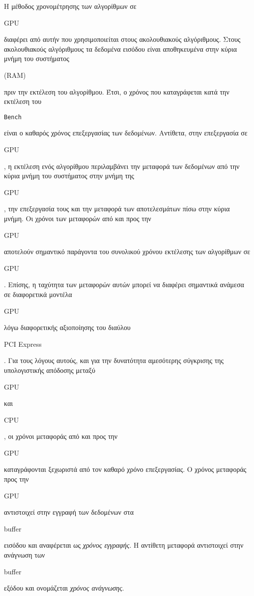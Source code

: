 Η μέθοδος χρονομέτρησης των αλγορίθμων σε \begin{english}GPU\end{english} διαφέρει από αυτήν που χρησιμοποιείται στους ακολουθιακούς αλγόριθμους. Στους ακολουθιακούς αλγόριθμους τα δεδομένα εισόδου είναι αποθηκευμένα στην κύρια μνήμη του συστήματος \begin{english}(RAM)\end{english} πριν την εκτέλεση του αλγορίθμου. Έτσι, ο χρόνος που καταγράφεται κατά την εκτέλεση του \begin{english}\verb!Bench!\end{english} είναι ο καθαρός χρόνος επεξεργασίας των δεδομένων. Αντίθετα, στην επεξεργασία σε \begin{english}GPU\end{english}, η εκτέλεση ενός αλγορίθμου  περιλαμβάνει την μεταφορά των δεδομένων από την κύρια μνήμη του συστήματος στην μνήμη της \begin{english}GPU\end{english}, την επεξεργασία τους και την μεταφορά των αποτελεσμάτων πίσω στην κύρια μνήμη. Οι χρόνοι των μεταφορών από και προς την \begin{english}GPU\end{english} αποτελούν σημαντικό παράγοντα του συνολικού χρόνου εκτέλεσης των αλγορίθμων σε \begin{english}GPU\end{english}. Επίσης, η ταχύτητα των μεταφορών αυτών μπορεί να διαφέρει σημαντικά ανάμεσα σε 
διαφορετικά μοντέλα \begin{english}GPU\end{english} λόγω διαφορετικής αξιοποίησης του διαύλου \begin{english}PCI Express\end{english}. Για τους λόγους αυτούς, και για την δυνατότητα αμεσότερης σύγκρισης της υπολογιστικής απόδοσης μεταξύ \begin{english}GPU\end{english} και \begin{english}CPU\end{english}, οι χρόνοι μεταφοράς από και προς την \begin{english}GPU\end{english} καταγράφονται ξεχωριστά από τον καθαρό χρόνο επεξεργασίας. Ο χρόνος μεταφοράς προς την \begin{english}GPU\end{english} αντιστοιχεί στην εγγραφή των δεδομένων στα \begin{english}buffer\end{english} εισόδου και αναφέρεται ως \textit{χρόνος εγγραφής}. Η αντίθετη μεταφορά αντιστοιχεί στην ανάγνωση των \begin{english}buffer\end{english} εξόδου και ονομάζεται \textit{χρόνος ανάγνωσης}. 


